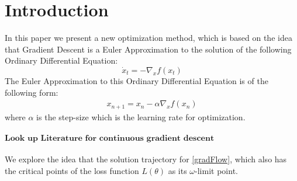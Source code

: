 \section{Introduction}
In this paper we present a new optimization method, which is based on the idea that Gradient Descent is a Euler Approximation to the solution of the following Ordinary Differential Equation:
\begin{equation}\label{gradFlow}
\dot{x}_t = -\nabla_{x}f(x_t)
\end{equation}
The Euler Approximation to this Ordinary Differential Equation is of the following form:
\begin{align*}
x_{n+1} =  x_n - \alpha \nabla_{x}f(x_n)
\end{align*}
where $\alpha$ is the step-size which is the learning rate for optimization.
\\
\\
$\textbf{Look up Literature for continuous gradient descent}$
\\
\\


We explore the idea that the solution trajectory for \eqref{gradFlow}, which also has the critical points of the loss function $L(\theta)$ as its $\omega$-limit point.

